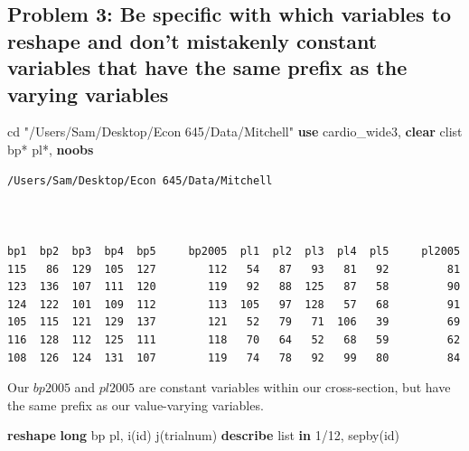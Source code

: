 \documentclass[
]{book}
\newenvironment{Shaded}{\begin{snugshade}}{\end{snugshade}}
\newcommand{\KeywordTok}[1]{\textcolor[rgb]{0.13,0.29,0.53}{\textbf{#1}}}
\newcommand{\NormalTok}[1]{#1}
\newcommand{\OtherTok}[1]{\textcolor[rgb]{0.56,0.35,0.01}{#1}}
\newcommand{\StringTok}[1]{\textcolor[rgb]{0.31,0.60,0.02}{#1}}
\begin{document}
\subsection*{Problem 3: Be specific with which variables to reshape and don't mistakenly constant variables that have the same prefix as the varying variables}\label{problem-3-be-specific-with-which-variables-to-reshape-and-dont-mistakenly-constant-variables-that-have-the-same-prefix-as-the-varying-variables}

\begin{Shaded}
\begin{Highlighting}[]
\NormalTok{cd }\StringTok{"/Users/Sam/Desktop/Econ 645/Data/Mitchell"}
\KeywordTok{use}\NormalTok{ cardio\_wide3, }\KeywordTok{clear}
\NormalTok{clist bp* pl*, }\KeywordTok{noobs}
\end{Highlighting}
\end{Shaded}

\begin{verbatim}
/Users/Sam/Desktop/Econ 645/Data/Mitchell



bp1  bp2  bp3  bp4  bp5     bp2005  pl1  pl2  pl3  pl4  pl5     pl2005
115   86  129  105  127        112   54   87   93   81   92         81
123  136  107  111  120        119   92   88  125   87   58         90
124  122  101  109  112        113  105   97  128   57   68         91
105  115  121  129  137        121   52   79   71  106   39         69
116  128  112  125  111        118   70   64   52   68   59         62
108  126  124  131  107        119   74   78   92   99   80         84
\end{verbatim}

Our \(bp2005\) and \(pl2005\) are constant variables within our cross-section, but have the same prefix as our value-varying variables.

\begin{Shaded}
\begin{Highlighting}[]
\KeywordTok{reshape} \KeywordTok{long}\NormalTok{ bp pl, i(id) j(trialnum)}
\KeywordTok{describe}
\OtherTok{list} \KeywordTok{in}\NormalTok{ 1/12, sepby(id)}
\end{Highlighting}
\end{Shaded}
\end{document}
